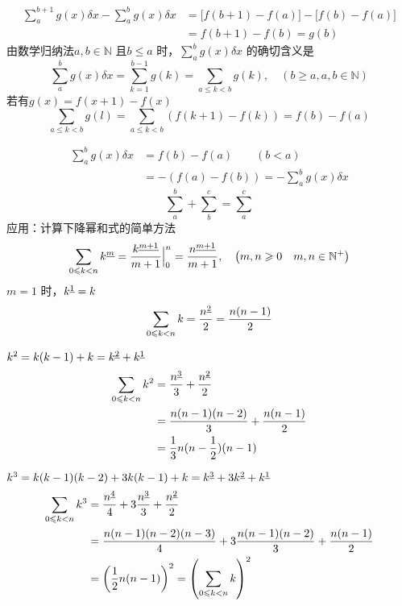 \begin{align*}
    \sum_{a}^{b+1}g(x) \delta x - \sum_{a}^{b}g(x) \delta x 
    &= \bigl[f(b+1)-f(a)\bigr] - \bigl[f(b)-f(a)\bigr] \\
    &= f(b+1)-f(b) = g(b)
\end{align*}
由数学归纳法$ a, b \in\mathbb{N} $ 且$ b\leqslant a $ 时，$ \sum_{a}^{b}g(x)\delta x $ 的确切含义是
\begin{equation}
    \sum_{a}^{b}g(x) \delta x = \sum_{k=1}^{b-1}g(k) = \sum_{a\leqslant k < b}g(k),\quad (b\geqslant a, a,b\in \mathbb{N})
\end{equation}
若有$ g(x)=f(x+1)-f(x) $ 
\begin{equation*}
    \sum_{a\leqslant k <b}g(l) = \sum_{a\leqslant k<b}(f(k+1)-f(k))=f(b)-f(a)
\end{equation*}

\begin{align*}
    \sum_{a}^{b}g(x)\delta x &= f(b)-f(a)\qquad (b<a) \\
    &= -(f(a)-f(b)) = -\sum_{a}^{b}g(x)\delta x
\end{align*}
\begin{equation*}
    \sum_{a}^{b}+\sum_{b}^{c} = \sum_{a}^{c}
\end{equation*}
应用：计算下降幂和式的简单方法
\begin{equation}
    \sum_{0\leqslant k<n}k^{\underline{m}} = \frac{k^{\underline{m+1}}}{m+1}\Big|_0^n = \frac{n^{\underline{m+1}}}{m+1},\quad \left(m,n\geqslant 0\quad m,n\in\mathbb{N}^+\right)
\end{equation}
$ m=1 $ 时，$ k^{\underline{1}}=k $ 
\begin{equation*}
    \sum_{0\leqslant k<n}k = \frac{n^{\underline{2}}}{2}=\frac{n(n-1)}{2}
\end{equation*}

$ k^2 = k(k-1)+k=k^{\underline{2}}+k^{\underline{1}} $ 
\begin{align*}
    \sum_{0\leqslant k<n} k^2
    &=\frac{n^{\underline{3}}}{3} + \frac{n^{\underline{2}}}{2} \\
    &=\frac{n(n-1)(n-2)}{3}+\frac{n(n-1)}{2} \\
    &=\frac{1}{3}n(n-\frac{1}{2})(n-1)
\end{align*}

$ k^3 = k(k-1)(k-2) +3k(k-1) +k=k^{\underline{3}}+3k^{\underline{2}}+k^{\underline{1}} $ 
\begin{align*}
    \sum_{0\leqslant k<n} k^3
    &=\frac{n^{\underline{4}}}{4}
    +3\frac{n^{\underline{3}}}{3}
    + \frac{n^{\underline{2}}}{2}\\
    &=\frac{n(n-1)(n-2)(n-3)}{4}+3\frac{n(n-1)(n-2)}{3}+\frac{n(n-1)}{2}\\
    &=\left(\frac{1}{2}n(n-1)\right)^2 = \left(\sum_{0\leqslant k<n} k\right)^2
\end{align*}

